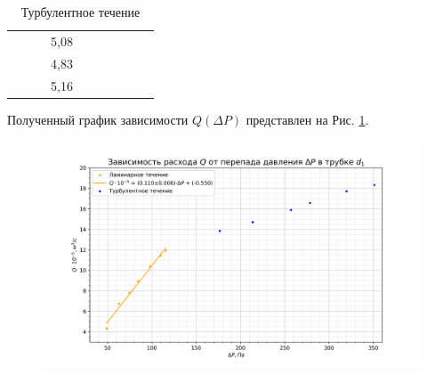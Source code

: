 \documentclass[a4paper, 12pt]{article}
\begin{document}
\begin{table}[h!]
\begin{tabular}{|c|c|c|c|c|c|c|c|c|c|}
                     &                           &                           & 5,08           &                           &                                    &                    &                         &                            &                               \\ \cline{4-4}
                     &                           &                           & 4,83           &                           &                                    &                    &                         &                            &                               \\ \cline{4-4}
                     &                           &                           & 5,16           &                           &                                    &                    &                         &                            &                               \\ \hline
\end{tabular}
\caption{Турбулентное течение}
\label{tab2}
\end{table}

\newpage
\par Полученный график зависимости $Q(\Delta{P})$ представлен на Рис. \ref{ris6}.
\begin{figure}[h!]
\begin{flushleft}
    \includegraphics[scale=0.75]{1.3.3_1.png}
\end{flushleft}
\caption{}
\label{ris6}
\end{figure}
\end{document}
